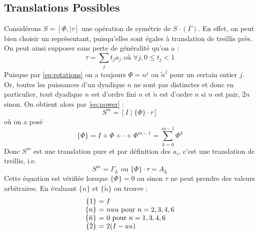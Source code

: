 \documentclass{cours}
\begin{document}
\subsection{Translations Possibles}
Considérons $S = \left[\Phi, \mid \tau\right]$ une opération de symétrie de $S \cdot \left(\Gamma\right)$. En effet, on peut bien choisir un représentant, puisqu'elles sont égales à translation de treillis près. On peut ainsi supposer sans perte de généralité qu'on a :
\begin{equation}
    \tau = \sum_{j}t_{j}a_{j} \text{ où } \forall j, 0 \leq t_{j} < 1
\end{equation}
Puisque par \ref{eq:rotations} on a toujours $\Phi = n^{j}$ ou $\tilde{n}^{j}$ pour un certain entier $j$. Or, toutes les puissances d'un dyadique $n$ ne sont pas distinctes et donc en particulier, tout dyadique $n$ est d'ordre fini $n$ et $\tilde{n}$ est d'ordre $n$ si $n$ est pair, $2n$ sinon. On obtient alors par \ref{eq:power} :
\begin{equation}
    S^{m} = \left[I \mid \{\Phi\}\cdot \tau\right]
\end{equation}
où on a posé
\begin{equation}
    \{\Phi\} = I + \Phi + \cdot + \Phi^{m - 1} = \sum_{k = 0}^{m - 1}\Phi^{k}
\end{equation}
Donc $S^{m}$ est une translation pure et par définition des $a_{i}$, c'est une translation de treillis, i.e.
\begin{equation}\label{eq:transpotence}
    S^{m} = \Gamma_{L} \text{ ou } \{\Phi\}\cdot \tau = A_{L}
\end{equation}
Cette équation est vérifiée lorsque $\{\Phi\} = 0$ ou sinon $\tau$ ne peut prendre des valeurs arbitraires. En évaluant $\{n\}$ et $\{\tilde{n}\}$ on trouve :
\begin{equation}
    \begin{array}{>{\{}r<{\}}@{\ = \ }l}
        1         & I                                 \\
        n         & n uu \text{ pour } n = 2, 3, 4, 6 \\
        \tilde{n} & 0 \text{ pour } n = 1, 3, 4, 6    \\
        \tilde{2} & 2(I - uu)
    \end{array}
\end{equation}
\end{document}
